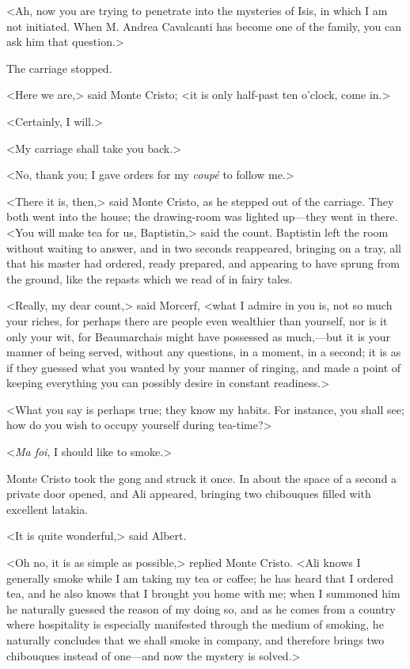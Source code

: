  <Ah, now you are trying to penetrate into the mysteries of Isis, in which I am not initiated. When M. Andrea Cavalcanti has become one of the family, you can ask him that question.> 

 The carriage stopped. 

 <Here we are,> said Monte Cristo; <it is only half-past ten o'clock, come in.> 

 <Certainly, I will.> 

 <My carriage shall take you back.> 

 <No, thank you; I gave orders for my \textit{coupé} to follow me.> 

 <There it is, then,> said Monte Cristo, as he stepped out of the carriage. They both went into the house; the drawing-room was lighted up—they went in there. <You will make tea for us, Baptistin,> said the count. Baptistin left the room without waiting to answer, and in two seconds reappeared, bringing on a tray, all that his master had ordered, ready prepared, and appearing to have sprung from the ground, like the repasts which we read of in fairy tales. 

 <Really, my dear count,> said Morcerf, <what I admire in you is, not so much your riches, for perhaps there are people even wealthier than yourself, nor is it only your wit, for Beaumarchais might have possessed as much,—but it is your manner of being served, without any questions, in a moment, in a second; it is as if they guessed what you wanted by your manner of ringing, and made a point of keeping everything you can possibly desire in constant readiness.> 

 <What you say is perhaps true; they know my habits. For instance, you shall see; how do you wish to occupy yourself during tea-time?> 

 <\textit{Ma foi}, I should like to smoke.> 

 Monte Cristo took the gong and struck it once. In about the space of a second a private door opened, and Ali appeared, bringing two chibouques filled with excellent latakia. 

 <It is quite wonderful,> said Albert. 

 <Oh no, it is as simple as possible,> replied Monte Cristo. <Ali knows I generally smoke while I am taking my tea or coffee; he has heard that I ordered tea, and he also knows that I brought you home with me; when I summoned him he naturally guessed the reason of my doing so, and as he comes from a country where hospitality is especially manifested through the medium of smoking, he naturally concludes that we shall smoke in company, and therefore brings two chibouques instead of one—and now the mystery is solved.> 

